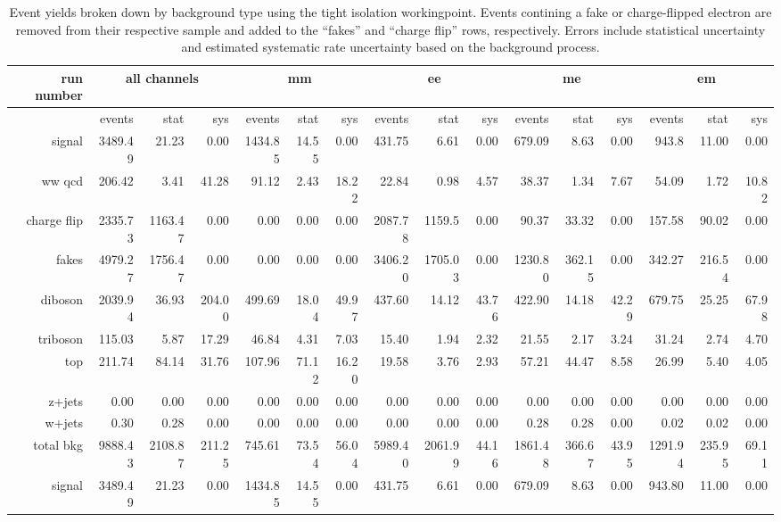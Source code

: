 \begin{sidewaystable}[!htbp]
  {\scriptsize
    \begin{tabular}{r|rrr|rrr|rrr|rrr|rrr}
      run number&\multicolumn{3}{c|}{all channels}&\multicolumn{3}{c|}{mm}&\multicolumn{3}{c|}{ee}&\multicolumn{3}{c|}{me}&\multicolumn{3}{c}{em}\\
      \hline
      &events&stat&sys&events&stat&sys&events&stat&sys&events&stat&sys&events&stat&sys\\
      \hline\hline
      signal&3489.49&21.23&0.00&1434.85&14.55&0.00&431.75&6.61&0.00&679.09&8.63&0.00&943.8&11.00&0.00\\

      ww qcd&206.42&3.41&41.28&91.12&2.43&18.22&22.84&0.98&4.57&38.37&1.34&7.67&54.09&1.72&10.82\\

      charge flip&2335.73&1163.47&0.00&0.00&0.00&0.00&2087.78&1159.5&0.00&90.37&33.32&0.00&157.58&90.02&0.00\\

      fakes&4979.27&1756.47&0.00&0.00&0.00&0.00&3406.20&1705.03&0.00&1230.80&362.15&0.00&342.27&216.54&0.00\\

      diboson&2039.94&36.93&204.00&499.69&18.04&49.97&437.60&14.12&43.76&422.90&14.18&42.29&679.75&25.25&67.98\\

      triboson&115.03&5.87&17.29&46.84&4.31&7.03&15.40&1.94&2.32&21.55&2.17&3.24&31.24&2.74&4.70\\

      top&211.74&84.14&31.76&107.96&71.12&16.20&19.58&3.76&2.93&57.21&44.47&8.58&26.99&5.40&4.05\\

      z+jets&0.00&0.00&0.00&0.00&0.00&0.00&0.00&0.00&0.00&0.00&0.00&0.00&0.00&0.00&0.00\\

      w+jets&0.30&0.28&0.00&0.00&0.00&0.00&0.00&0.00&0.00&0.28&0.28&0.00&0.02&0.02&0.00\\
      \hline
      total bkg&9888.43&2108.87&211.25&745.61&73.54&56.04&5989.40&2061.99&44.16&1861.48&366.67&43.95&1291.94&235.95&69.11\\
      signal&3489.49&21.23&0.00&1434.85&14.55&0.00&431.75&6.61&0.00&679.09&8.63&0.00&943.80&11.00&0.00\\
      \hline\hline
    \end{tabular}
  }
  \caption{Event yields broken down by background type using the tight isolation workingpoint.  Events contining a fake or charge-flipped electron are removed from their respective sample and added to the ``fakes'' and ``charge flip'' rows, respectively.  Errors include statistical uncertainty and estimated systematic rate uncertainty based on the background process.}
  \label{tab:EY_tight}
\end{sidewaystable}
